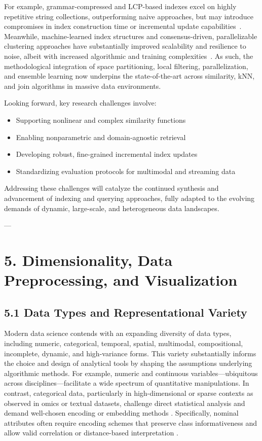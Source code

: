 \documentclass[11pt]{article}
\begin{document}
For example, grammar-compressed and LCP-based indexes excel on highly repetitive string collections, outperforming naive approaches, but may introduce compromises in index construction time or incremental update capabilities~\cite{ref73,ref91,ref98}. Meanwhile, machine-learned index structures and consensus-driven, parallelizable clustering approaches have substantially improved scalability and resilience to noise, albeit with increased algorithmic and training complexities~\cite{ref111,ref116}. As such, the methodological integration of space partitioning, local filtering, parallelization, and ensemble learning now underpins the state-of-the-art across similarity, kNN, and join algorithms in massive data environments.

Looking forward, key research challenges involve:

\begin{itemize}
    \item Supporting nonlinear and complex similarity functions
    \item Enabling nonparametric and domain-agnostic retrieval
    \item Developing robust, fine-grained incremental index updates
    \item Standardizing evaluation protocols for multimodal and streaming data
\end{itemize}

Addressing these challenges will catalyze the continued synthesis and advancement of indexing and querying approaches, fully adapted to the evolving demands of dynamic, large-scale, and heterogeneous data landscapes.

---

\section{5. Dimensionality, Data Preprocessing, and Visualization}

\subsection{5.1 Data Types and Representational Variety}

Modern data science contends with an expanding diversity of data types, including numeric, categorical, temporal, spatial, multimodal, compositional, incomplete, dynamic, and high-variance forms. This variety substantially informs the choice and design of analytical tools by shaping the assumptions underlying algorithmic methods. For example, numeric and continuous variables—ubiquitous across disciplines—facilitate a wide spectrum of quantitative manipulations. In contrast, categorical data, particularly in high-dimensional or sparse contexts as observed in omics or textual datasets, challenge direct statistical analysis and demand well-chosen encoding or embedding methods \cite{ref61,ref62,ref63}. Specifically, nominal attributes often require encoding schemes that preserve class informativeness and allow valid correlation or distance-based interpretation \cite{ref61}.
\end{document}
